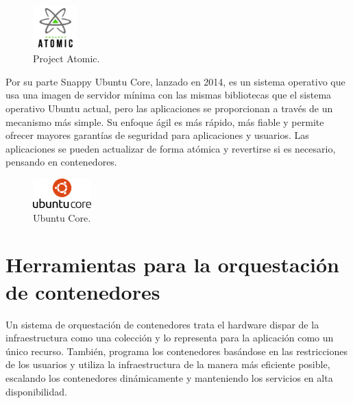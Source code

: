 \begin{figure}[H]
\centering
\includegraphics[width=0.15\textwidth]{images/figures/projectatomic.png}
\caption{Project Atomic.\footnotemark}
\end{figure}


Por su parte Snappy Ubuntu Core, lanzado en 2014, es un sistema operativo que usa una imagen de servidor mínima con las mismas bibliotecas que el sistema operativo Ubuntu actual, pero las aplicaciones se proporcionan a través de un mecanismo más simple. Su enfoque ágil es más rápido, más fiable y permite ofrecer mayores garantías de seguridad para aplicaciones y usuarios. Las aplicaciones se pueden actualizar de forma atómica y revertirse si es necesario, pensando en contenedores.

\begin{figure}[H]
\centering
\includegraphics[width=0.2\textwidth]{images/figures/ubuntucore.jpg}
\caption{Ubuntu Core.\footnotemark}
\end{figure}


\section{Herramientas para la orquestación de contenedores} \label{sec:herramientas}

Un sistema de orquestación de contenedores trata el hardware dispar de la infraestructura como una colección y lo representa para la aplicación como un único recurso. También, programa los contenedores basándose en las restricciones de los usuarios y utiliza la infraestructura de la manera más eficiente posible, escalando los contenedores dinámicamente y manteniendo los servicios en alta disponibilidad.

